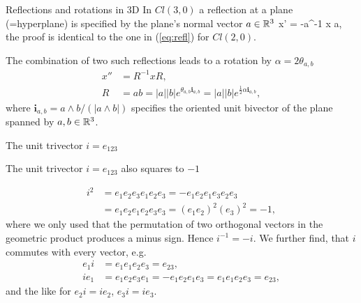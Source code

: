 \documentclass[10pt]{beamer}
\begin{document}
\begin{frame}[fragile]{Reflections and rotations in 3D}
In $Cl(3,0)$ a reflection at a plane (=hyperplane) is specified by the plane's normal vector $a\in\mathbb{R}^3$
\be 
  x' = -a^{-1} x a,
\ee 
the proof is identical to the one in (\ref{eq:refl}) for $Cl(2,0)$. 

The combination of two such reflections leads to a rotation by $\alpha = 2 \theta_{a,b}$
\begin{align} 
  x'' &= R^{-1} x R, 
  \\ 
  R &= ab = |a||b| e^{\theta_{a,b}\mathbf{i}_{a,b}}
  = |a||b| e^{\frac{1}{2}\alpha \mathbf{i}_{a,b}},
  \nonumber
\end{align} 
where $\mathbf{i}_{a,b}={a \wedge b}/({|a\wedge b|})$ specifies the oriented unit bivector of the plane spanned by $a,b \in \mathbb{R}^3$. 

\end{frame}

\begin{frame}[fragile]{The unit trivector $i=e_{123}$}

\alert{The unit trivector $i=e_{123}$ also squares to $-1$}

\begin{align}
  i^2 &= e_1e_2e_3e_1e_2e_3 
  = - e_1e_2e_1e_3e_2e_3 \nonumber \\
  &= e_1e_2e_1e_2 e_3e_3 = (e_1e_2)^2 (e_3)^2 = -1,
\end{align}
where we only used that the permutation of two orthogonal vectors in the geometric product produces a minus sign. 
Hence $i^{-1} = - i$. 
\pause
We further find, that $i$ commutes with every vector, e.g.
\begin{align} 
  e_1 i &= e_1 e_1e_2e_3 = e_{23}, 
  \\
  i e_1 &= e_1e_2e_3 e_1 = - e_1e_2e_1e_3 = e_1e_1 e_2e_3 = e_{23}, 
  \nonumber 
\end{align} 
\pause
and the like for $e_2 i = i e_2$, $e_3 i = i e_3$. 

\end{frame}
\end{document}
